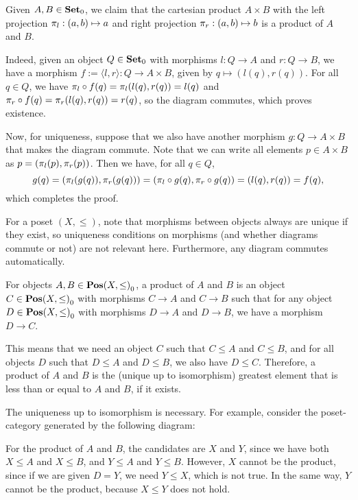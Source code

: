 \begin{solution}\label{sol:product_set}
Given $ A, B \in {\mathbf{Set}}_0 $, we claim that the cartesian product $ A \times B $ with the left projection $ \pi_l: (a, b) \mapsto a $ and right projection $ \pi_r: (a, b) \mapsto b $ is a product of $ A $ and $ B $.

Indeed, given an object $ Q \in {\mathbf{Set}}_0 $ with morphisms $ l: Q \to A $ and $ r: Q \to B $, we have a morphism $ f := \langle l, r \rangle : Q \to A \times B $, given by $ q \mapsto (l(q), r(q)) $. For all $ q \in Q $, we have $ \pi_l \circ f(q) = \pi_l(l(q), r(q)) = l(q) $ and $ \pi_r \circ f(q) = \pi_r(l(q), r(q)) = r(q) $, so the diagram commutes, which proves existence.

Now, for uniqueness, suppose that we also have another morphism $ g: Q \to A \times B $ that makes the diagram commute. Note that we can write all elements $ p \in A \times B $ as $ p = (\pi_l(p), \pi_r(p)) $. Then we have, for all $ q \in Q $,
\[ g(q) = (\pi_l(g(q)), \pi_r(g(q))) = (\pi_l \circ g(q), \pi_r \circ g(q)) = (l(q), r(q)) = f(q), \]
which completes the proof.
\end{solution}

\begin{solution}\label{sol:product_posetcat}
	For a poset $ (X, \leq) $, note that morphisms between objects always are unique if they exist, so uniqueness conditions on morphisms (and whether diagrams commute or not) are not relevant here.
	Furthermore, any diagram commutes automatically.
	
	For objects $ A, B \in {\mathbf{Pos}(X, \leq)}_0 $, a product of $ A $ and $ B $ is an object $ C \in {\mathbf{Pos}(X, \leq)}_0 $ with morphisms $ C \to A $ and $ C \to B $ such that for any object $ D \in {\mathbf{Pos}(X, \leq)}_0 $ with morphisms $ D \to A $ and $ D \to B $, we have a morphism $ D \to C $.

	This means that we need an object $ C $ such that $ C \leq A $ and $ C \leq B $, and for all objects $ D $ such that $ D \leq A $ and $ D \leq B $, we also have $ D \leq C $. Therefore, a product of $ A $ and $ B $ is the (unique up to isomorphism) greatest element that is less than or equal to $ A $ and $ B $, if it exists.

	\begin{rem}
		The uniqueness up to isomorphism is necessary. For example, consider the poset-category generated by the following diagram:
		\begin{center}
		\end{center}
		For the product of $ A $ and $ B $, the candidates are $ X $ and $ Y $, since we have both $ X \leq A $ and $ X \leq B $, and $ Y \leq A $ and $ Y \leq B $. However, $ X $ cannot be the product, since if we are given $ D = Y $, we need $ Y \leq X $, which is not true. In the same way, $ Y $ cannot be the product, because $ X \leq Y $ does not hold.
	\end{rem}
\end{solution}

